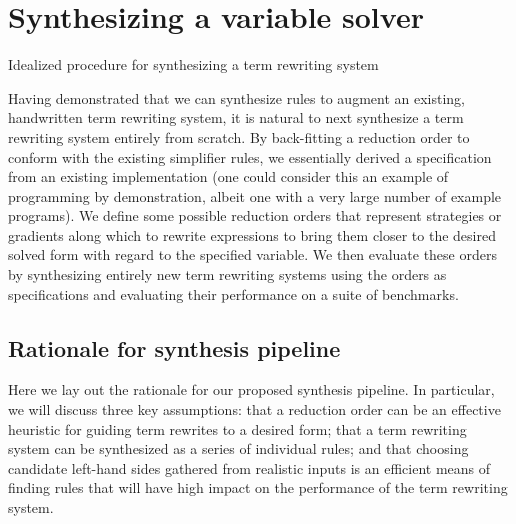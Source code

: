 \section{Synthesizing a variable solver}

\begin{algorithm}[H]
\SetAlgoLined
{}
\caption{Idealized procedure for synthesizing a term rewriting system}
\label{algo:synthesis}
\end{algorithm}

Having demonstrated that we can synthesize rules to augment an existing, handwritten term rewriting system, it is natural to next synthesize a term rewriting system entirely from scratch. By back-fitting a reduction order to conform with the existing simplifier rules, we essentially derived a specification from an existing implementation (one could consider this an example of programming by demonstration, albeit one with a very large number of example programs). We define some possible reduction orders that represent strategies or gradients along which to rewrite expressions to bring them closer to the desired solved form with regard to the specified variable. We then evaluate these orders by synthesizing entirely new term rewriting systems using the orders as specifications and evaluating their performance on a suite of benchmarks.

\subsection{Rationale for synthesis pipeline}

Here we lay out the rationale for our proposed synthesis pipeline. In particular, we will discuss three key assumptions: that a reduction order can be an effective heuristic for guiding term rewrites to a desired form; that a term rewriting system can be synthesized as a series of individual rules; and that choosing candidate left-hand sides gathered from realistic inputs is an efficient means of finding rules that will have high impact on the performance of the term rewriting system.

